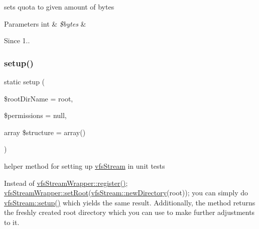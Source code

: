 sets quota to given amount of bytes


\begin{DoxyParams}[1]{Parameters}
int & {\em \$bytes} & \\
\hline
\end{DoxyParams}
\begin{DoxySince}{Since}
1.. 
\end{DoxySince}
\mbox{\label{classorg_1_1bovigo_1_1vfs_1_1vfs_stream_ad34a51eb551a4b587f9fd7191c3f6896}} 
\subsubsection{\texorpdfstring{setup()}{setup()}}
{\footnotesize\ttfamily static setup (\begin{DoxyParamCaption}\item[{}]{\$root\+Dir\+Name = {\ttfamily \textquotesingle{}root\textquotesingle{}},  }\item[{}]{\$permissions = {\ttfamily null},  }\item[{array}]{\$structure = {\ttfamily array()} }\end{DoxyParamCaption})\hspace{0.3cm}{\ttfamily [static]}}

helper method for setting up \mbox{\hyperlink{classorg_1_1bovigo_1_1vfs_1_1vfs_stream}{vfs\+Stream}} in unit tests

Instead of \mbox{\hyperlink{classorg_1_1bovigo_1_1vfs_1_1vfs_stream_wrapper_a610b9c89b82e11ea426e1804874a6ef4}{vfs\+Stream\+Wrapper\+::register()}}; \mbox{\hyperlink{classorg_1_1bovigo_1_1vfs_1_1vfs_stream_wrapper_a9e895af9df4006a20d6dcbe4747398a2}{vfs\+Stream\+Wrapper\+::set\+Root}}(\mbox{\hyperlink{classorg_1_1bovigo_1_1vfs_1_1vfs_stream_a7aafb7859f4a5ce5cd434236fefe121b}{vfs\+Stream\+::new\+Directory}}(\textquotesingle{}root\textquotesingle{})); you can simply do \mbox{\hyperlink{classorg_1_1bovigo_1_1vfs_1_1vfs_stream_ad34a51eb551a4b587f9fd7191c3f6896}{vfs\+Stream\+::setup()}} which yields the same result. Additionally, the method returns the freshly created root directory which you can use to make further adjustments to it.

